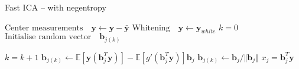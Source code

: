 \begin{algorithm}[H]
\caption{Fast ICA -- with negentropy }
\begin{algorithmic}[1]
			\State $\text{Center measurements} \quad \textbf{y} \gets \textbf{y} - \bar{\textbf{y}}$
			\State $\text{Whitening} \quad \textbf{y}\gets \textbf{y}_{white}$ 
			\EndProcedure  
			\State
			\State$k=0$            
            \State$\text{Initialise random vector} \quad \textbf{b}_{j(k)}$ 
            
               		\State $k = k+1$
                	\State $\textbf{b}_{j(k)} \gets \mathbb{E}[ \textbf{y}(\textbf{b}_{j}^T \textbf{y})] - \mathbb{E}[g'(\textbf{b}_{j}^T \textbf{y})] \textbf{b}_{j}$  
                	\State $\textbf{b}_{j(k)} \gets \textbf{b}_j/\Vert \textbf{b}_j \Vert $ 
          		\EndWhile
          		\State $x_{j} = \textbf{b}_{j}^T\textbf{y}$
          	\EndFor
          	
            \EndProcedure
        \end{algorithmic} 
        \label{alg:fastICA}
\end{algorithm}

%

